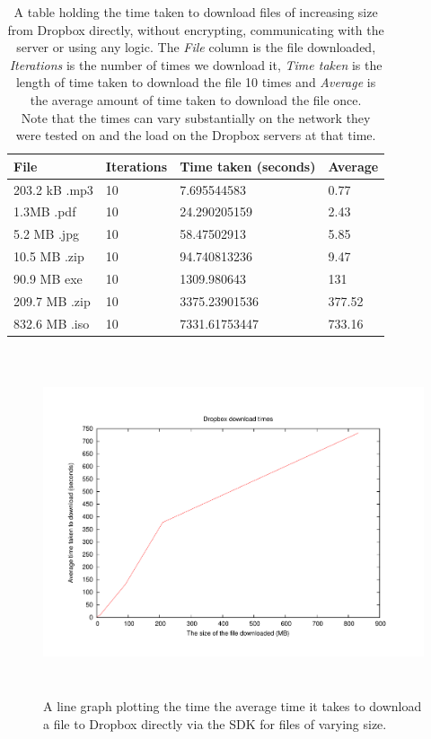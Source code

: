 \documentclass[12pt, titlepage]{article}
\begin{document}
\bigskip
\begin{table}[H]
\begin{center}
    \begin{tabular}{ | l | l | l | l |}
    \hline
    \textbf{File} & \textbf{Iterations} & \textbf{Time taken (seconds)} & \textbf{Average} \\ \hline
    
    203.2 kB .mp3 & 10 & 7.695544583 & 0.77 \\ \hline
    1.3MB .pdf & 10 & 24.290205159 & 2.43 \\ \hline
    5.2 MB .jpg & 10 & 58.47502913 & 5.85 \\ \hline
    10.5 MB .zip & 10 & 94.740813236 & 9.47 \\ \hline
    90.9 MB exe & 10 & 1309.980643 & 131 \\ \hline
    209.7 MB .zip & 10 & 3375.23901536 & 377.52 \\ \hline
    832.6 MB .iso & 10 & 7331.61753447 & 733.16 \\ \hline    
    \end{tabular}
    \caption{A table holding the time taken to download files of increasing size from Dropbox directly, without encrypting, communicating with the server or using any logic. The \textit{File} column is the file downloaded, \textit{Iterations} is the number of times we download it, \textit{Time taken} is the length of time taken to download the file 10 times and \textit{Average} is the average amount of time taken to download the file once. \\ Note that the times can vary substantially on the network they were tested on and the load on the Dropbox servers at that time.} \label{tab:downloadDropboxBenchmark}
    \end{center}
\end{table}

\begin{figure}[H]
\centerline{\includegraphics[height=4.0in,width=7in,angle=0]{plots/dropboxDownload/dropboxDownloadTimes.pdf}}
\caption{A line graph plotting the time the average time it takes to download a file to Dropbox directly via the SDK for files of varying size.}
\label{fig:dropboxDownloadLineGraph}
\end{figure}
\end{document}
